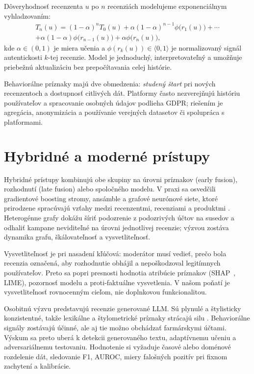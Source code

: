 \documentclass[10pt,twocolumn,twoside,slovak,a4paper]{article}
\begin{document}
Dôveryhodnosť recenzenta $u$ po $n$ recenziách modelujeme exponenciálnym vyhladzovaním:
\begin{multline}
T_n(u) = (1-\alpha)^n T_0(u)
+ \alpha(1-\alpha)^{n-1}\phi\bigl(r_1(u)\bigr) + \cdots \\
+ \alpha(1-\alpha)\phi\bigl(r_{n-1}(u)\bigr) + \alpha\phi\bigl(r_n(u)\bigr),
\label{eq:postupnost}
\end{multline}
kde $\alpha \in (0,1)$ je miera učenia a $\phi(r_k(u)) \in \langle 0,1\rangle$ je normalizovaný signál autentickosti $k$-tej recenzie. Model je jednoduchý, interpretovateľný a umožňuje priebežnú aktualizáciu bez prepočítavania celej histórie.

Behaviorálne príznaky majú dve obmedzenia: \emph{studený štart} pri nových recenzentoch a dostupnosť citlivých dát. Platformy často nezverejňujú históriu používateľov a spracovanie osobných údajov podlieha GDPR; riešením je agregácia, anonymizácia a používanie verejných datasetov či spolupráca s platformami.


\section{Hybridné a moderné prístupy} \label{hybridne}

Hybridné prístupy kombinujú obe skupiny na úrovni príznakov (early fusion), rozhodnutí (late fusion) alebo spoločného modelu. V praxi sa osvedčili gradientové boosting stromy, ansámble a grafové neurónové siete, ktoré prirodzene spracúvajú vzťahy medzi recenzentmi, recenziami a produktmi \cite{rayana2015}. Heterogénne grafy dokážu šíriť podozrenie z podozrivých účtov na susedov a odhaliť kampane neviditeľné na úrovni jednotlivej recenzie; výzvou zostáva dynamika grafu, škálovateľnosť a vysvetliteľnosť.

Vysvetliteľnosť je pri nasadení kľúčová: moderátor musí vedieť, prečo bola recenzia označená, aby rozhodnutie obhájil a nepoškodzoval legitímnych používateľov. Preto sa popri presnosti hodnotia atribúcie príznakov (SHAP~\cite{lundberg2017}, LIME), pozornosť modelu a proti-faktuálne vysvetlenia. V našom poňatí je vysvetliteľnosť rovnocenným cieľom, nie doplnkovou funkcionalitou.

Osobitnú výzvu predstavujú recenzie generované LLM. Sú plynulé a štylisticky konzistentné, takže lexikálne a štylometrické príznaky strácajú silu \cite{zhao2025}. Behaviorálne signály zostávajú účinné, ale aj tie možno obchádzať farmárskymi účtami. Výskum sa preto uberá k detekcii generovaného textu, adaptívnemu učeniu a adversariálnemu testovaniu. Hodnotenie si vyžaduje časové alebo doménové rozdelenie dát, sledovanie F1, AUROC, miery falošných pozitív pri fixnom zachytení a kalibrácie.
\end{document}
